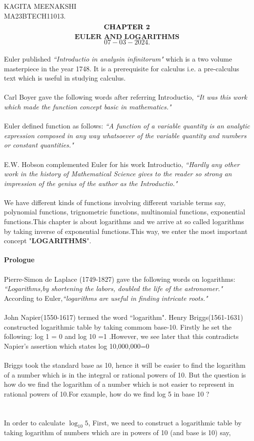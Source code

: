\documentclass[a4paper,11pt]{article}
\begin{document}
\noindent KAGITA MEENAKSHI\\
MA23BTECH11013.\\
$$\textbf{CHAPTER 2}\\$$
$$\textbf{EULER AND LOGARITHMS}$$
$$07-03-2024.$$\\
Euler published \textit{``Introductio in analysin infinitorum"} which is a two volume masterpiece in the year 1748. It is a prerequisite for calculus i.e. a 
pre-calculus text which is useful in studying calculus.\\
\\
\noindent Carl Boyer gave the following words after referring Introductio, \textit{``It was this 
work which made the function concept basic in mathematics."}\\
\\
Euler defined function as follows: 
\textit{``A function of a variable quantity is an analytic expression composed in any way whatsoever of the variable quantity and numbers 
or constant quantities."}\\
\\
E.W. Hobson complemented Euler for his work Introductio,
\textit{``Hardly any other work in the history of Mathematical Science gives 
to the reader so strong an impression of the genius of the author as 
the Introductio."}\\
\\
We have different kinds of functions involving different variable terms say,
polynomial functions, trignometric functions, multinomial functions, exponential functions.This chapter is about logarithms and we arrive at so called logarithms by taking inverse of exponential functions.This way, we enter the most important concept
"\textbf{LOGARITHMS}".\\
\\
\textbf{Prologue}\\
\\
Pierre-Simon de Laplace (1749-1827) gave the following words on
logarithms:
\textit{``Logarithms,by shortening the labors, doubled the life of the astronomer."}\\
According to Euler,\textit{``logarithms are useful in finding intricate roots."}\\
\\
John Napier(1550-1617) termed the word ``logarithm".
Henry Briggs(1561-1631) constructed logarithmic table by taking commom base-10. Firstly he set the following: log 1 = 0 and log 10 =1 .However, we see later that this contradicts Napier's assertion which states log 10,000,000=0\\
\\
Briggs took the standard base as 10, hence it will be easier to find the logarithm of a number which is in the integral or rational powers of 10.
But the question is how do we find the logarithm of a number which is not easier to represent in rational powers of 10.For example, how do we find log 5 in base 10 ?\\
\\
\\
In order to calculate $\log_{10}5$, First, we need to construct a logarithmic table by taking logarithm of  numbers which are in powers of 10 (and base is 10) say,\\
\end{document}
